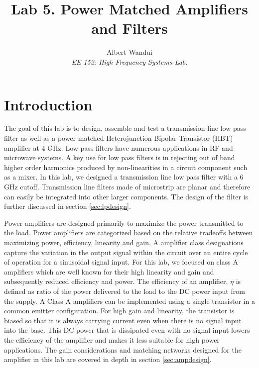 \documentclass{article}
\begin{document}
\title{Lab 5. Power Matched Amplifiers and Filters }
\author{Albert Wandui \\
\textit{EE 152: High Frequency Systems Lab.}}
\maketitle


\section*{Introduction}\label{sec:introduction}
The goal of this lab is to design, assemble and test a transmission line low pass filter as well as a power matched Heterojunction Bipolar Transistor (HBT) amplifier at 4 GHz. Low pass filters have numerous applications in RF and microwave systems. A key use for low pass filters is in rejecting out of band higher order harmonics produced by non-linearities in a circuit component such as a mixer. In this lab, we designed a transmission line low pass filter with a 6 GHz cutoff. Transmission line filters made of microstrip are planar and therefore can easily be integrated into other larger components. The design of the filter is further discussed in section \ref{sec:lpdesign}.

Power amplifiers are designed primarily to maximize the power transmitted to the load. Power amplifiers are categorized based on the relative tradeoffs between maximizing power, efficiency, linearity and gain. A amplifier class designations capture the variation in the output signal within the circuit over an entire cycle of operation for a sinusoidal signal input. For this lab, we focused on class A amplifiers which are well known for their high linearity and gain and subsequently reduced efficiency and power. The efficiency of an amplifier, $\eta$ is defined as ratio of the power delivered to the load to the DC power input from the supply. A Class A amplifiers can be implemented using a single transistor in a common emitter configuration. For high gain and linearity, the transistor is biased so that it is always carrying current even when there is no signal input into the base. This DC power that is dissipated even with no signal input lowers the efficiency of the amplifier and makes it less suitable for high power applications. The gain considerations and matching networks designed for the amplifier in this lab are covered in depth in section \ref{sec:ampdesign}. 
\end{document}
